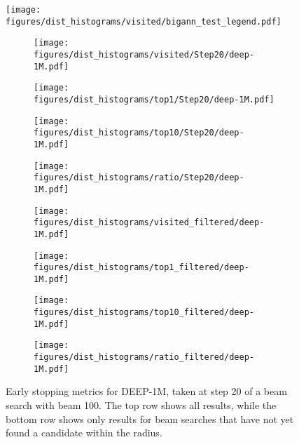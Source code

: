 \begin{figure*}
	\centering
	\texttt{[image: figures/dist\_histograms/visited/bigann\_test\_legend.pdf]} \\
	\begin{subfigure}{.24\textwidth}
		\texttt{[image: figures/dist\_histograms/visited/Step20/deep-1M.pdf]}
	\end{subfigure}
	\begin{subfigure}{.24\textwidth}
		\texttt{[image: figures/dist\_histograms/top1/Step20/deep-1M.pdf]}
	\end{subfigure}
	\begin{subfigure}{.24\textwidth}
		\texttt{[image: figures/dist\_histograms/top10/Step20/deep-1M.pdf]}
	\end{subfigure}
	\begin{subfigure}{.24\textwidth}
		\texttt{[image: figures/dist\_histograms/ratio/Step20/deep-1M.pdf]}
	\end{subfigure}
	\begin{subfigure}{.24\textwidth}
		\texttt{[image: figures/dist\_histograms/visited\_filtered/deep-1M.pdf]}
	\end{subfigure}
	\begin{subfigure}{.24\textwidth}
		\texttt{[image: figures/dist\_histograms/top1\_filtered/deep-1M.pdf]}
	\end{subfigure}
	\begin{subfigure}{.24\textwidth}
		\texttt{[image: figures/dist\_histograms/top10\_filtered/deep-1M.pdf]}
	\end{subfigure}
	\begin{subfigure}{.24\textwidth}
		\texttt{[image: figures/dist\_histograms/ratio\_filtered/deep-1M.pdf]}
	\end{subfigure}
	\caption{Early stopping metrics for DEEP-1M, taken at step 20 of a beam search with beam 100. The top row shows all results, while the bottom row shows only results for beam searches that have not yet found a candidate within the radius.}
	\label{fig:deep_earlystop}
\end{figure*}

